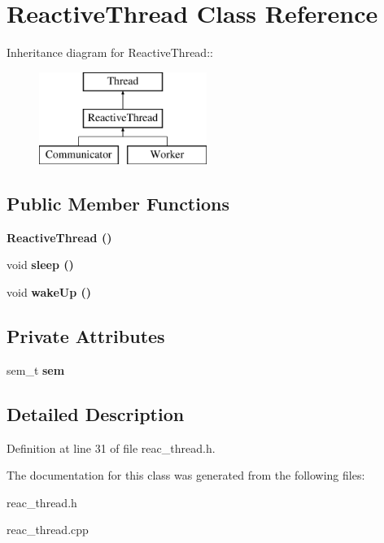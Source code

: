 \section{Reactive\-Thread Class Reference}
\label{class_reactive_thread}
Inheritance diagram for Reactive\-Thread::\begin{figure}[H]
\begin{center}
\leavevmode
\includegraphics[height=3cm]{class_reactive_thread}
\end{center}
\end{figure}
\subsection*{Public Member Functions}
\begin{CompactItemize}
\item 
\bf{Reactive\-Thread} ()\label{class_reactive_thread_77381649429941c99a3e3d568113d6cf}

\item 
void \bf{sleep} ()\label{class_reactive_thread_8263c2a32d8c99a49a05f1a7717d4262}

\item 
void \bf{wake\-Up} ()\label{class_reactive_thread_a724a54575de10f09cc03ab7aa4e59ce}

\end{CompactItemize}
\subsection*{Private Attributes}
\begin{CompactItemize}
\item 
sem\_\-t \bf{sem}\label{class_reactive_thread_915e5a42dc8cb1bcf6738d5fe883a4e7}

\end{CompactItemize}


\subsection{Detailed Description}




Definition at line 31 of file reac\_\-thread.h.

The documentation for this class was generated from the following files:\begin{CompactItemize}
\item 
reac\_\-thread.h\item 
reac\_\-thread.cpp\end{CompactItemize}
